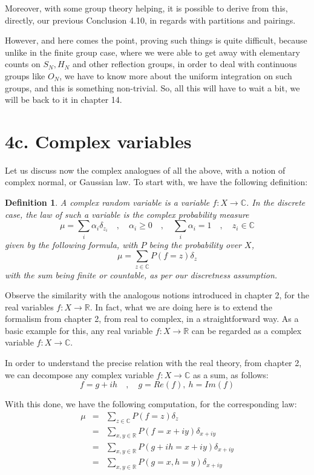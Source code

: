 \documentclass[12pt]{amsbook}
\newtheorem{definition}[theorem]{Definition}
\begin{document}
\bigskip

Moreover, with some group theory helping, it is possible to derive from this, directly, our previous Conclusion 4.10, in regards with partitions and pairings.

\bigskip

However, and here comes the point, proving such things is quite difficult, because unlike in the finite group case, where we were able to get away with elementary counts on $S_N,H_N$ and other reflection groups, in order to deal with continuous groups like $O_N$, we have to know more about the uniform integration on such groups, and this is something non-trivial. So, all this will have to wait a bit, we will be back to it in chapter 14.

\section*{4c. Complex variables}

Let us discuss now the complex analogues of all the above, with a notion of complex normal, or Gaussian law. To start with, we have the following definition:

\begin{definition}
A complex random variable is a variable $f:X\to\mathbb C$. In the discrete case, the law of such a variable is the complex probability measure
$$\mu=\sum_i\alpha_i\delta_{z_i}\quad,\quad\alpha_i\geq0\quad,\quad\sum_i\alpha_i=1\quad,\quad z_i\in\mathbb C$$
given by the following formula, with $P$ being the probability over $X$,
$$\mu=\sum_{z\in\mathbb C}P(f=z)\delta_z$$
with the sum being finite or countable, as per our discretness assumption.
\end{definition}

Observe the similarity with the analogous notions introduced in chapter 2, for the real variables $f:X\to\mathbb R$. In fact, what we are doing here is to extend the formalism from chapter 2, from real to complex, in a straightforward way. As a basic example for this, any real variable $f:X\to\mathbb R$ can be regarded as a complex variable $f:X\to\mathbb C$.

\bigskip

In order to understand the precise relation with the real theory, from chapter 2, we can decompose any complex variable $f:X\to\mathbb C$ as a sum, as follows:
$$f=g+ih\quad,\quad g=Re(f),\ h=Im(f)$$

With this done, we have the following computation, for the corresponding law:
\begin{eqnarray*}
\mu
&=&\sum_{z\in\mathbb C}P(f=z)\delta_z\\
&=&\sum_{x,y\in\mathbb R}P(f=x+iy)\delta_{x+iy}\\
&=&\sum_{x,y\in\mathbb R}P(g+ih=x+iy)\delta_{x+iy}\\
&=&\sum_{x,y\in\mathbb R}P(g=x,h=y)\delta_{x+iy}
\end{eqnarray*}
\end{document}
